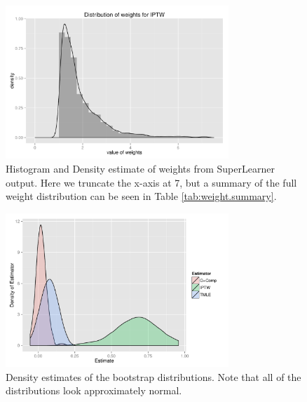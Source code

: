 \documentclass{article}
\begin{document}
\begin{figure}
\centering
\includegraphics[width=0.75\textwidth]{figures/density-plot_ghat.pdf}
\caption{Histogram and Density estimate of weights from SuperLearner output. Here we truncate the x-axis at 7, but a summary of the full weight distribution can be seen in Table \ref{tab:weight.summary}.}
\label{fig:weight.dist}
\end{figure}

\begin{figure}
\centering
\includegraphics[width=0.75\textwidth]{figures/naiveBootstrapDensities.pdf}
\caption{Density estimates of the bootstrap distributions. Note that all of the distributions look approximately normal.}
\label{fig:boot.distr}
\end{figure}
\end{document}
